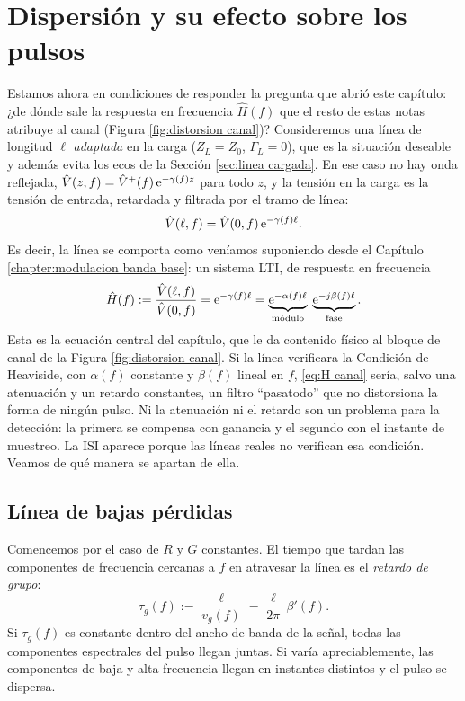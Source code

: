 
\section{Dispersión y su efecto sobre los pulsos}\label{sec:dispersion pulsos}

Estamos ahora en condiciones de responder la pregunta que abrió este capítulo: ¿de dónde sale la respuesta en frecuencia $\hat H(f)$ que el resto de estas notas atribuye al canal (Figura \ref{fig:distorsion canal})? Consideremos una línea de longitud $\ell$ \emph{adaptada} en la carga ($Z_L=Z_0$, $\Gamma_L=0$), que es la situación deseable y además evita los ecos de la Sección \ref{sec:linea cargada}. En ese caso no hay onda reflejada, $\hat V(z,f)=\hat V^+(f)\,\mathrm{e}^{-\gamma(f) z}$ para todo $z$, y la tensión en la carga es la tensión de entrada, retardada y filtrada por el tramo de línea:
\begin{equation*}
    \hat V(\ell,f) = \hat V(0,f)\, \mathrm{e}^{-\gamma(f)\ell}.
\end{equation*}
Es decir, la línea se comporta como veníamos suponiendo desde el Capítulo \ref{chapter:modulacion banda base}: un sistema LTI, de respuesta en frecuencia
\begin{equation}\label{eq:H canal}
    \hat H(f) := \frac{\hat V(\ell,f)}{\hat V(0,f)} = \mathrm{e}^{-\gamma(f)\ell} = \underbrace{\mathrm{e}^{-\alpha(f)\ell}}_{\text{módulo}}\;\underbrace{\mathrm{e}^{-j\beta(f)\ell}}_{\text{fase}}.
\end{equation}
Esta es la ecuación central del capítulo, que le da contenido físico al bloque de canal de la Figura \ref{fig:distorsion canal}. Si la línea verificara la Condición de Heaviside, con $\alpha(f)$ constante y $\beta(f)$ lineal en $f$, \eqref{eq:H canal} sería, salvo una atenuación y un retardo constantes, un filtro ``pasatodo'' que no distorsiona la forma de ningún pulso. Ni la atenuación ni el retardo son un problema para la detección: la primera se compensa con ganancia y el segundo con el instante de muestreo. La ISI aparece porque las líneas reales no verifican esa condición. Veamos de qué manera se apartan de ella.

\subsection*{Línea de bajas pérdidas}

Comencemos por el caso de $R$ y $G$ constantes. El tiempo que tardan las componentes de frecuencia cercanas a $f$ en atravesar la línea es el \emph{retardo de grupo}:
\begin{equation*}
    \tau_g(f) := \frac{\ell}{v_g(f)} = \frac{\ell}{2\pi}\,\beta'(f).
\end{equation*}
Si $\tau_g(f)$ es constante dentro del ancho de banda de la señal, todas las componentes espectrales del pulso llegan juntas. Si varía apreciablemente, las componentes de baja y alta frecuencia llegan en instantes distintos y el pulso se dispersa.

